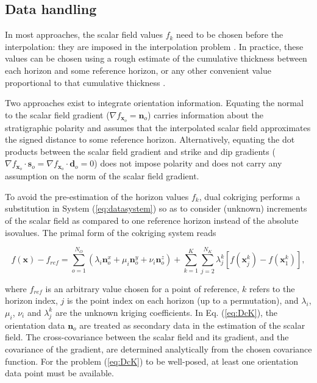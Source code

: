 \documentclass[preprint]{ring20}
\newcommand{\bx}{\mathbf{x}}
\newcommand{\bn}{\mathbf{n}}
\begin{document}
 
\subsection {Data handling}

In most approaches, the scalar field values $f_k$ need to be chosen before the interpolation: they are imposed in the interpolation problem \citep[e.g., ][]{Frank2007CG,Hillier2014MG,Renaudeau2019MG,Irakarama2022CD}. In practice, these values can be chosen using a rough estimate of the cumulative thickness between each horizon and some reference horizon, or any other convenient value proportional to that cumulative thickness \citep{Caumon2013GaRSITo,Collon-Drouaillet2015C&G,Collon2016I}. 

Two approaches exist to integrate orientation information. Equating the normal to the scalar field gradient ($\nabla f_{\bx_o} = \mathbf{n}_o$) carries information about the stratigraphic polarity and assumes that the interpolated scalar field approximates the signed distance to some reference horizon. Alternatively, equating the dot products between the scalar field gradient and strike and dip gradients ($\nabla f_{\bx_o} \cdot \mathbf{s}_o = \nabla f_{\bx_o} \cdot \mathbf{d}_o = 0$) does not impose polarity and does not carry any assumption on the norm of the scalar field gradient. 

To avoid the pre-estimation of the horizon values $f_k$, dual cokriging \citep[DcK, ][]{Lajaunie1997MG,Chiles04OMSMP} performs a substitution in System (\ref{eq:datasystem}) so as to consider (unknown) increments of the scalar field as compared to one reference horizon instead of the absolute isovalues. The primal form of the cokriging system reads

\begin{equation}
\label{eq:DcK}
f(\bx) - f_{ref} = \sum_{o=1}^{N_O} (\lambda_i \bn_o^x + \mu_i \bn_o^y + \nu_i \bn_o^z) + \sum_{k=1}^{K} \sum_{j=2}^{N_K} \lambda_{j}^{k}[f(\bx_j^k) - f(\bx_1^k)], 
\end{equation}

\noindent where $f_{ref}$ is an arbitrary value chosen for a point of reference, $k$ refers to the horizon index, $j$ is the point index on each horizon (up to a permutation), and $\lambda_i$, $\mu_i$, $\nu_i$ and $\lambda_j^k$ are the unknown kriging coefficients. In Eq. (\ref{eq:DcK}), the orientation data $\bn_o$ are treated as secondary data in the estimation of the scalar field. The cross-covariance between the scalar field and its gradient, and the covariance of the gradient, are determined analytically from the chosen covariance function. For the problem (\ref{eq:DcK}) to be well-posed, at least one orientation data point must be available. 
\end{document}

